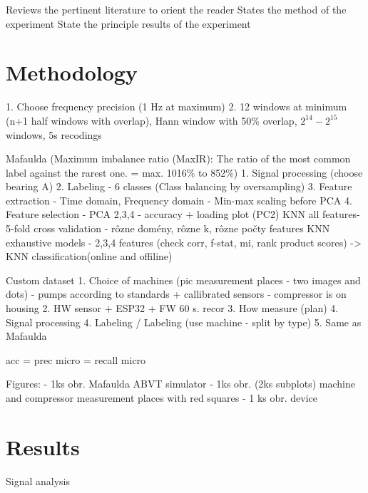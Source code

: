 \documentclass{llncs}
\begin{document}
\cite{jung_vibration_2017}  %


    Reviews the pertinent literature to orient the reader
    States the method of the experiment
    State the principle results of the experiment



\section{Methodology}

1. Choose frequency precision (1 Hz at maximum)
2. 12 windows at minimum (n+1 half windows with overlap), Hann window with 50\% overlap, $2^14 - 2^15$ windows, 5s recodings


Mafaulda (Maximum imbalance ratio (MaxIR): The ratio of the most common label against the rarest one. = max. 1016\% to 852\%)
1. Signal processing (choose bearing A)
2. Labeling - 6 classes (Class balancing by oversampling)
3. Feature extraction - Time domain, Frequency domain - Min-max scaling before PCA
4. Feature selection - 
	PCA 2,3,4 - accuracy + loading plot (PC2)
	KNN all features- 5-fold cross validation - rôzne domény, rôzne k, rôzne počty features
	KNN exhaustive models - 
		2,3,4 features (check corr, f-stat, mi, rank product scores)
	 -> KNN classification(online and offiline)

Custom dataset
1. Choice of machines (pic measurement places - two images and dots) - pumps according to standards + callibrated sensors
	- compressor is on housing
2. HW sensor + ESP32 + FW 60 s. recor
3. How measure (plan)
4. Signal processing
4. Labeling  / Labeling (use machine - split by type) 
5. Same as Mafaulda

acc = prec micro = recall micro


Figures:
- 1ks obr. Mafaulda ABVT simulator
- 1ks obr. (2ks subplots) machine and compressor measurement places with red squares
- 1 ks obr. device


\section{Results}
Signal analysis
\end{document}
